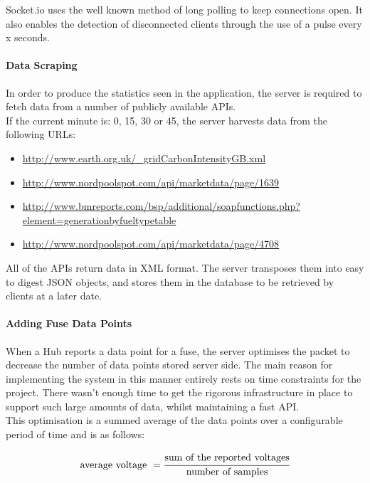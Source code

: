 \documentclass[preprint,12pt,3p]{elsarticle}
\begin{document}
Socket.io uses the well known method of long polling to keep connections open. It also enables the detection of disconnected clients through the use of a pulse every x seconds.

\paragraph{Data Scraping}

In order to produce the statistics seen in the application, the server is required to fetch data from a number of publicly available APIs.\\
If the current minute is: 0, 15, 30 or  45, the server harvests data from the following URLs:
\begin{itemize}
\item \url{http://www.earth.org.uk/_gridCarbonIntensityGB.xml}

\item \url{http://www.nordpoolspot.com/api/marketdata/page/1639}

\item \url{http://www.bmreports.com/bsp/additional/soapfunctions.php?element=generationbyfueltypetable}

\item \url{http://www.nordpoolspot.com/api/marketdata/page/4708}
\end{itemize}
All of the APIs return data in XML format. The server transposes them into easy to digest JSON objects, and stores them in the database to be retrieved by clients at a later date.\\

\paragraph{Adding Fuse Data Points}
When a Hub reports a data point for a fuse, the server optimises the packet to decrease the number of data points stored server side. The main reason for implementing the system in this manner entirely rests on time constraints for the project. There wasn't enough time to get the rigorous infrastructure in place to support such large amounts of data, whilst maintaining a fast API.\\
This optimisation is a summed average of the data points over a configurable period of time and is as follows:

\begin{equation*} 
\text{average voltage } = \cfrac{\text{sum of the reported voltages}}{\text{number of samples}}
\end{equation*}
\end{document}
